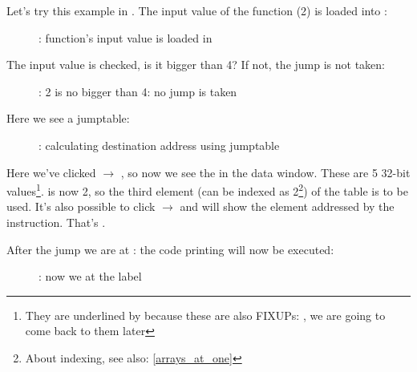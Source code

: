 ﻿\clearpage
\mysubparagraph{\olly}
\myindex{\olly}

Let's try this example in \olly.
The input value of the function (2) is loaded into \EAX: 

\begin{figure}[H]
\centering
{}
\caption{\olly: function's input value is loaded in \EAX}
\label{fig:switch_lot_olly1}
\end{figure}

\clearpage
The input value is checked, is it bigger than 4? 
If not, the  jump is not taken:
\begin{figure}[H]
\centering
{}
\caption{\olly: 2 is no bigger than 4: no jump is taken}
\label{fig:switch_lot_olly2}
\end{figure}

\clearpage
Here we see a jumptable:

\begin{figure}[H]
\centering
{}
\caption{\olly: calculating destination address using jumptable}
\label{fig:switch_lot_olly3}
\end{figure}

Here we've clicked  $\rightarrow$ , so now we see the  in the data window.
These are 5 32-bit values\footnote{They are underlined by \olly because
these are also FIXUPs: , we are going to come back to them later}.
\ECX is now 2, so the third element (can be indexed as 2\footnote{About indexing, see also: \ref{arrays_at_one}}) of the table is to be used.
It's also possible to click  $\rightarrow$ 
 and \olly will show the element addressed by the \JMP instruction. 
That's .

\clearpage
After the jump we are at : the code printing  will now be executed:

\begin{figure}[H]
\centering
{}
\caption{\olly: now we at the  label}
\label{fig:switch_lot_olly4}
\end{figure}
